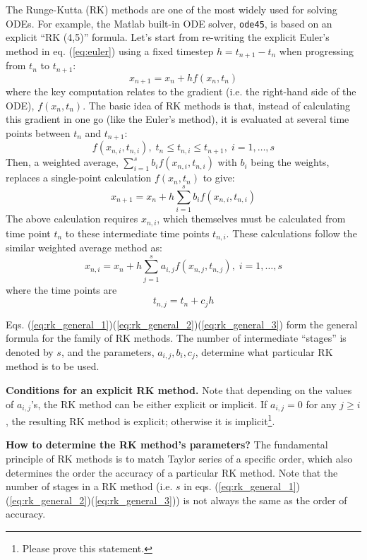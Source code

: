 \documentclass[a4paper,11pt]{article}
\theoremstyle{definition}
\begin{document}
The Runge-Kutta (RK) methods are one of the most widely used for solving ODEs. 
For example, the Matlab built-in ODE solver, \texttt{ode45}, is based on an explicit ``RK (4,5)'' formula.
Let's start from re-writing the explicit Euler's method in eq. (\ref{eq:euler}) using a fixed
timestep $h=t_{n+1}-t_n$ when progressing from $t_n$ to $t_{n+1}$:
\begin{equation}
	x_{n+1} = x_n + h f(x_n, t_n)
\end{equation}
\noindent where the key computation relates to the gradient (i.e. the right-hand side of the ODE), 
$f(x_n, t_n)$. The basic idea of RK methods is that, instead of calculating
this gradient in one go (like the Euler's method), it is evaluated at several time points
between $t_n$ and $t_{n+1}$:
\[ f(x_{n,i}, t_{n,i}), \; t_n \leq t_{n,i} \leq t_{n+1}, \; i = 1, \ldots, s \]
Then, a weighted average, $\sum_{i=1}^s b_i f(x_{n,i}, t_{n,i})$ with $b_i$ being the weights, 
replaces a single-point calculation $f(x_n, t_n)$ to give:
\begin{equation} \label{eq:rk_general_1}
	x_{n+1} = x_n + h \sum_{i=1}^s b_i f(x_{n,i}, t_{n,i}) 
\end{equation}
\noindent The above calculation requires $x_{n,i}$, which themselves must be calculated from
time point $t_n$ to these intermediate time points $t_{n,i}$. 
These calculations follow the similar weighted average method as:
\begin{equation} \label{eq:rk_general_2}
	x_{n,i} = x_n + h \sum_{j=1}^s a_{i,j} f(x_{n,j}, t_{n,j}), \; i = 1, \ldots, s 
\end{equation}
\noindent where the time points are
\begin{equation} \label{eq:rk_general_3}
	t_{n,j} = t_n + c_j h
\end{equation}

Eqs. (\ref{eq:rk_general_1})(\ref{eq:rk_general_2})(\ref{eq:rk_general_3}) form the
general formula for the family of RK methods. The number of intermediate ``stages'' is
denoted by $s$, and the parameters, $a_{i,j}, b_i, c_j$, determine what particular
RK method is to be used. 

\textbf{Conditions for an explicit RK method.}
Note that depending on the values of $a_{i,j}$'s, the RK method can be either explicit or implicit.
If $a_{i,j} = 0$ for any $j \geq i$, the resulting RK method is explicit; 
otherwise it is implicit\footnote{Please prove this statement.}.

\textbf{How to determine the RK method's parameters?} The fundamental principle of RK methods
is to match Taylor series of a specific order, which also determines the order the accuracy of a
particular RK method. Note that the number of stages in a RK method (i.e. $s$ in 
eqs. (\ref{eq:rk_general_1})(\ref{eq:rk_general_2})(\ref{eq:rk_general_3})) is not always the same as
the order of accuracy. 
\end{document}
